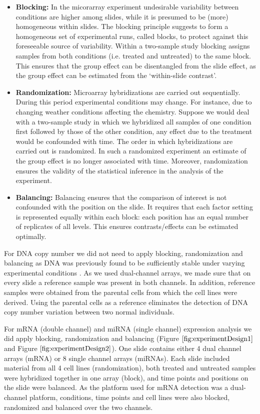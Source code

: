 \begin{itemize}
\item \textbf{Blocking:} In the micorarray experiment undesirable variability between conditions are higher among slides, while it is presumed to be (more) homogeneous within slides. The blocking principle suggests to form a homogeneous set of experimental runs, called blocks, to protect against this foreseeable source of variability. Within a two-sample study blocking assigns samples from both conditions (i.e. treated and untreated) to the same block. This ensures that the group effect can be disentangled from the slide effect, as the group effect can be estimated from the `within-slide contrast'.

\item \textbf{Randomization:} Microarray hybridizations are carried out sequentially. During this period experimental conditions may change. For instance, due to changing weather conditions affecting the chemistry. Suppose we would deal with a two-sample study in which we hybridized all samples of one condition first followed by those of the other condition, any effect due to the treatment would be confounded with time. The order in which hybridizations are carried out is randomized. In such a randomized experiment an estimate of the group effect is no longer associated with time. Moreover, randomization ensures the validity of the statistical inference in the analysis of the experiment.

\item \textbf{Balancing:} Balancing ensures that the comparison of interest is not confounded with the position on the slide. It requires that each factor setting is represented equally within each block: each position has an equal number of replicates of all levels. This ensures contrasts/effects can be estimated optimally.
\end{itemize}
 
For DNA copy number we did not need to apply blocking, randomization and balancing as DNA was previously found to be sufficiently stable under varying experimental conditions \cite{Buffart2008}. As we used dual-channel arrays, we made sure that on every slide a reference sample was present in both channels. In addition, reference samples were obtained from the parental cells from which the cell lines were derived. Using the parental cells as a reference eliminates the detection of DNA copy number variation between two normal individuals.

For mRNA (double channel) and miRNA (single channel) expression analysis we did apply blocking, randomization and balancing (Figure $\ref{fig:experimentDesign1}$ and Figure $\ref{fig:experimentDesign2}$). One slide contains either 4 dual channel arrays (mRNA) or 8 single channel arrays (miRNAs). Each slide included material from all 4 cell lines (randomization), both treated and untreated samples were hybridized together in one array (block), and time points and positions on the slide were balanced. As the platform used for mRNA detection was a dual-channel platform, conditions, time points and cell lines were also blocked, randomized and balanced over the two channels. 

